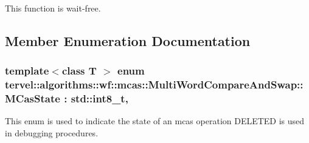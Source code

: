 This function is wait-\/free. 

\subsection{Member Enumeration Documentation}
\hypertarget{classtervel_1_1algorithms_1_1wf_1_1mcas_1_1_multi_word_compare_and_swap_acc59b33256be2492c2d576bd1b770027}{}
\subsubsection[{M\+Cas\+State}]{\setlength{\rightskip}{0pt plus 5cm}template$<$class T $>$ enum {\bf tervel\+::algorithms\+::wf\+::mcas\+::\+Multi\+Word\+Compare\+And\+Swap\+::\+M\+Cas\+State} \+: std\+::int8\+\_\+t\hspace{0.3cm}{\ttfamily [strong]}, {\ttfamily [private]}}\label{classtervel_1_1algorithms_1_1wf_1_1mcas_1_1_multi_word_compare_and_swap_acc59b33256be2492c2d576bd1b770027}


This enum is used to indicate the state of an mcas operation D\+E\+L\+E\+T\+E\+D is used in debugging procedures. 

